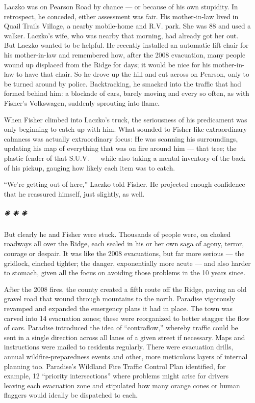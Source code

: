 Laczko was on Pearson Road by chance --- or because of his own
stupidity. In retrospect, he conceded, either assessment was fair. His
mother-in-law lived in Quail Trails Village, a nearby mobile-home and
R.V. park. She was 88 and used a walker. Laczko's wife, who was nearby
that morning, had already got her out. But Laczko wanted to be helpful.
He recently installed an automatic lift chair for his mother-in-law and
remembered how, after the 2008 evacuation, many people wound up
displaced from the Ridge for days; it would be nice for his
mother-in-law to have that chair. So he drove up the hill and cut across
on Pearson, only to be turned around by police. Backtracking, he smacked
into the traffic that had formed behind him: a blockade of cars, barely
moving and every so often, as with Fisher's Volkswagen, suddenly
sprouting into flame.

When Fisher climbed into Laczko's truck, the seriousness of his
predicament was only beginning to catch up with him. What sounded to
Fisher like extraordinary calmness was actually extraordinary focus: He
was scanning his surroundings, updating his map of everything that was
on fire around him --- that tree; the plastic fender of that S.U.V. ---
while also taking a mental inventory of the back of his pickup, gauging
how likely each item was to catch.

``We're getting out of here,'' Laczko told Fisher. He projected enough
confidence that he reassured himself, just slightly, as well.

\hypertarget{---2}{%
\subparagraph{❈ ❈ ❈}\label{---2}}

But clearly he and Fisher were stuck. Thousands of people were, on
choked roadways all over the Ridge, each sealed in his or her own saga
of agony, terror, courage or despair. It was like the 2008 evacuations,
but far more serious --- the gridlock, cinched tighter; the danger,
exponentially more acute --- and also harder to stomach, given all the
focus on avoiding those problems in the 10 years since.

After the 2008 fires, the county created a fifth route off the Ridge,
paving an old gravel road that wound through mountains to the north.
Paradise vigorously revamped and expanded the emergency plans it had in
place. The town was carved into 14 evacuation zones; these were
reorganized to better stagger the flow of cars. Paradise introduced the
idea of ``contraflow,'' whereby traffic could be sent in a single
direction across all lanes of a given street if necessary. Maps and
instructions were mailed to residents regularly. There were evacuation
drills, annual wildfire-preparedness events and other, more meticulous
layers of internal planning too. Paradise's Wildland Fire Traffic
Control Plan identified, for example, 12 ``priority intersections''
where problems might arise for drivers leaving each evacuation zone and
stipulated how many orange cones or human flaggers would ideally be
dispatched to each.

